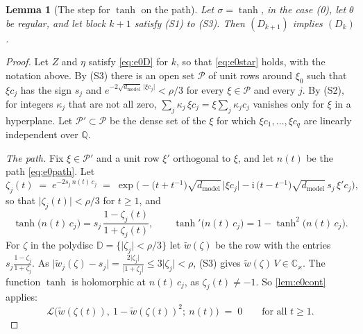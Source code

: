 \documentclass[10pt]{article}
\newtheorem{lemma}[theorem]{Lemma}
\theoremstyle{definition}
\theoremstyle{remark}
\newcommand{\dm}{d_{\mathrm{model}}}
\begin{document}
\begin{lemma}[The step for $\tanh$ on the path]\label{lem:e0steptanh}
Let $\sigma = \tanh$, in the case (0), let $\theta$ be regular, and let block $k+1$ satisfy (S1) to (S3). Then $(D_{k+1})$ implies $(D_k)$.
\end{lemma}

\begin{proof}
Let $Z$ and $\eta$ satisfy \eqref{eq:e0D} for $k$, so that \eqref{eq:e0star} holds, with the notation above. By (S3) there is an open set $\mathcal P$ of unit rows around $\xi_0$ such that $\xi c_j$ has the sign $s_j$ and $e^{-2\sqrt{\dm}\,\lvert\xi c_j\rvert} < \rho/3$ for every $\xi \in \mathcal P$ and every $j$. By (S2), for integers $\kappa_j$ that are not all zero, $\sum_j\kappa_j\,\xi c_j = \xi\sum_j\kappa_jc_j$ vanishes only for $\xi$ in a hyperplane. Let $\mathcal P' \subset \mathcal P$ be the dense set of the $\xi$ for which $\xi c_1, \dots, \xi c_q$ are linearly independent over $\mathbb Q$.

\emph{The path.} Fix $\xi \in \mathcal P'$ and a unit row $\xi'$ orthogonal to $\xi$, and let $n(t)$ be the path \eqref{eq:e0path}. Let
\[
\zeta_j(t) \;=\; e^{-2s_j\,n(t)\,c_j} \;=\; \exp\Big(-\big(t + t^{-1}\big)\sqrt{\dm}\,\lvert\xi c_j\rvert - \mathrm i\,\big(t - t^{-1}\big)\sqrt{\dm}\,s_j\,\xi'c_j\Big),
\]
so that $\lvert\zeta_j(t)\rvert < \rho/3$ for $t \ge 1$, and
\[
\tanh\big(n(t)\,c_j\big) = s_j\,\frac{1 - \zeta_j(t)}{1 + \zeta_j(t)}, \qquad \tanh'\big(n(t)\,c_j\big) = 1 - \tanh^2\big(n(t)\,c_j\big).
\]
For $\zeta$ in the polydisc $\mathbb D = \{\lvert\zeta_j\rvert < \rho/3\}$ let $\tilde w(\zeta)$ be the row with the entries $s_j\frac{1 - \zeta_j}{1 + \zeta_j}$. As $\lvert\tilde w_j(\zeta) - s_j\rvert = \frac{2\lvert\zeta_j\rvert}{\lvert1 + \zeta_j\rvert} \le 3\lvert\zeta_j\rvert < \rho$, (S3) gives $\tilde w(\zeta)\,V \in \mathbb C_\varkappa$. The function $\tanh$ is holomorphic at $n(t)\,c_j$, as $\zeta_j(t) \neq -1$. So \cref{lem:e0cont} applies:
\begin{equation}\label{eq:e0tanhpath}
\mathcal L\big(\tilde w(\zeta(t)),\ 1 - \tilde w(\zeta(t))^2;\ n(t)\big) \;=\; 0 \qquad\text{for all } t \ge 1 .
\end{equation}


\end{proof}
\end{document}

